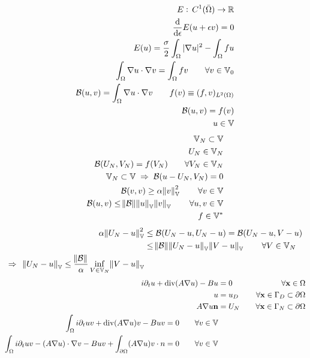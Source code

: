 \begin{align*}
  E:\, C^1(\bar{\Omega}) \rightarrow \mathbb{R} \\
  \frac{\mathrm{d}}{\mathrm{d}\epsilon}E(u+\epsilon v) = 0 \\
  E(u) = \frac{\sigma}{2} \int_{\Omega}|\nabla u|^2 - \int_{\Omega} fu \\
  \int_{\Omega} \nabla u \cdot \nabla v = \int_{\Omega} fv \qquad \forall v\in\mathbb{V}_0\\
  \mathcal{B}(u,v) = \int_{\Omega} \nabla u \cdot \nabla v \qquad f(v) \equiv (f,v)_{L^2(\Omega)} \\
  \mathcal{B}(u,v) = f(v)\\
  u\in\mathbb{V}
\end{align*}
\begin{align*}
  \mathbb{V}_N \subset \mathbb{V} \\
  U_N \in \mathbb{V}_N \\
  \mathcal{B}(U_N,V_N) = f(V_N) \qquad \forall V_N\in\mathbb{V}_N \\
  \mathbb{V}_N \subset \mathbb{V} \; \Rightarrow \; \mathcal{B}(u - U_N,V_N) = 0 \\
  \mathcal{B}(v,v) \geq \alpha \norm{v}_{\mathbb{V}}^2 \qquad \forall v\in\mathbb{V}\\
  \mathcal{B}(u,v) \leq \norm{\mathcal{B}}\norm{u}_{\mathbb{V}}\norm{v}_{\mathbb{V}} \qquad \forall u,v\in\mathbb{V}\\
  f\in\mathbb{V}^*
\end{align*}
\begin{align*}
  \alpha\norm{U_N-u}_{\mathbb{V}}^2 &\leq \mathcal{B}(U_N-u,U_N-u) = \mathcal{B}(U_N-u,V-u) \\
  &\leq\norm{\mathcal{B}}\norm{U_N-u}_{\mathbb{V}}\norm{V-u}_{\mathbb{V}} \qquad \forall V\in\mathbb{V}_N\\
  \Rightarrow \;\; \norm{U_N-u}_{\mathbb{V}} \leq \frac{\norm{\mathcal{B}}}{\alpha}\inf_{V\in\mathbb{V}_N}\norm{V-u}_{\mathbb{V}}
\end{align*}
\begin{align*}
  i \partial_t u + \operatorname{div}(A\nabla u) - Bu &= 0  \qquad &\forall \vb{x}\in\Omega \\
  u &= u_D                  & \forall \vb{x}\in\Gamma_D \subset \partial\Omega \\
  A\nabla u \vb{n} &= U_N   & \forall \vb{x}\in\Gamma_N \subset \partial\Omega\\
  \int_{\Omega} i \partial_t u v + \operatorname{div}(A\nabla u) v - Buv = 0 \qquad \forall v \in \mathbb{V} \\
  \int_{\Omega} i \partial_t u v - (A\nabla u)\cdot \nabla v - Buv + \int_{\partial\Omega}(A\nabla u)v\cdot n = 0 \qquad \forall v \in \mathbb{V} \\
\end{align*}

